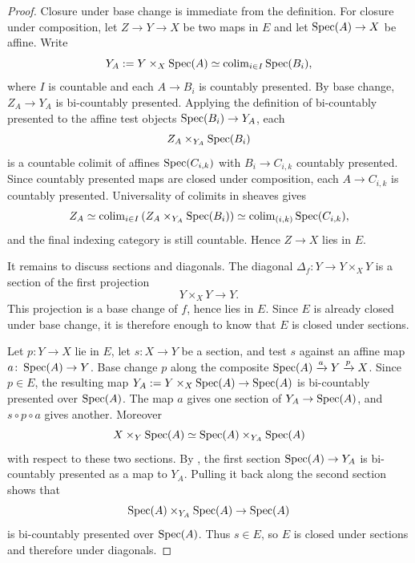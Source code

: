 \documentclass[11pt]{book}
\begin{document}
	\begin{proof}		
		Closure under base change is immediate from the definition. For closure under composition, let $Z \to Y \to X$ be two maps in $E$ and let $\operatorname{Spec}(A) \to X$ be affine. Write
		\[
			Y_A := Y \times_X \operatorname{Spec}(A) \simeq \operatorname{colim}_{i \in I} \operatorname{Spec}(B_i),
		\]
		where $I$ is countable and each $A \to B_i$ is countably presented. By base change, $Z_A \to Y_A$ is bi-countably presented. Applying the definition of bi-countably presented to the affine test objects $\operatorname{Spec}(B_i) \to Y_A$, each
		\[
			Z_A \times_{Y_A} \operatorname{Spec}(B_i)
		\]
		is a countable colimit of affines $\operatorname{Spec}(C_{i,k})$ with $B_i \to C_{i,k}$ countably presented. Since countably presented maps are closed under composition, each $A \to C_{i,k}$ is countably presented. Universality of colimits in sheaves gives
		\[
			Z_A \simeq \operatorname{colim}_{i \in I} \left(Z_A \times_{Y_A} \operatorname{Spec}(B_i)\right)
				\simeq \operatorname{colim}_{(i,k)} \operatorname{Spec}(C_{i,k}),
		\]
		and the final indexing category is still countable. Hence $Z \to X$ lies in $E$.
		
		It remains to discuss sections and diagonals. The diagonal $\Delta_f\colon Y \to Y \times_X Y$ is a section of the first projection
		\[
			Y \times_X Y \to Y.
		\]
		This projection is a base change of $f$, hence lies in $E$. Since $E$ is already closed under base change, it is therefore enough to know that $E$ is closed under sections.
		
		Let $p\colon Y \to X$ lie in $E$, let $s\colon X \to Y$ be a section, and test $s$ against an affine map $a\colon \operatorname{Spec}(A) \to Y$. Base change $p$ along the composite $\operatorname{Spec}(A) \xrightarrow{a} Y \xrightarrow{p} X$. Since $p \in E$, the resulting map $Y_A := Y \times_X \operatorname{Spec}(A) \to \operatorname{Spec}(A)$ is bi-countably presented over $\operatorname{Spec}(A)$. The map $a$ gives one section of $Y_A \to \operatorname{Spec}(A)$, and $s \circ p \circ a$ gives another. Moreover
		\[
			X \times_Y \operatorname{Spec}(A) \simeq \operatorname{Spec}(A) \times_{Y_A} \operatorname{Spec}(A)
		\]
		with respect to these two sections. By , the first section $\operatorname{Spec}(A) \to Y_A$ is bi-countably presented as a map to $Y_A$. Pulling it back along the second section shows that
		\[
			\operatorname{Spec}(A) \times_{Y_A} \operatorname{Spec}(A) \to \operatorname{Spec}(A)
		\]
		is bi-countably presented over $\operatorname{Spec}(A)$. Thus $s \in E$, so $E$ is closed under sections and therefore under diagonals.
	\end{proof}
\end{document}
